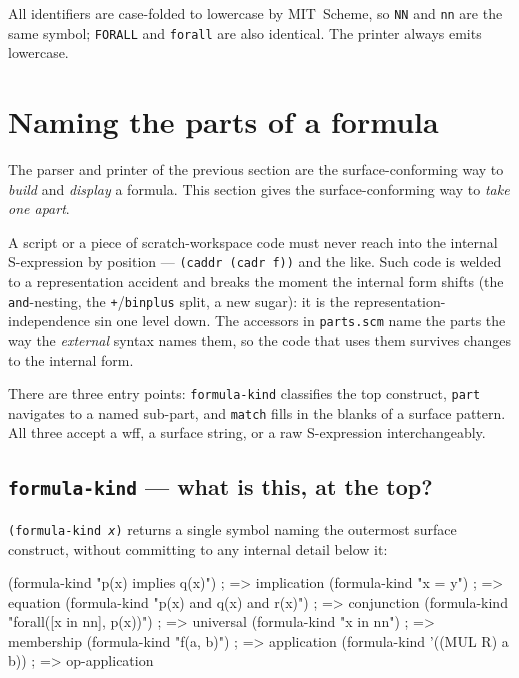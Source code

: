 \noindent
All identifiers are case-folded to lowercase by MIT~Scheme, so
\texttt{NN} and \texttt{nn} are the same symbol; \texttt{FORALL} and
\texttt{forall} are also identical.  The printer always emits lowercase.


\section{Naming the parts of a formula}
\label{sec:parts}

The parser and printer of the previous section are the surface-conforming
way to \emph{build} and \emph{display} a formula.  This section gives the
surface-conforming way to \emph{take one apart}.

A script or a piece of scratch-workspace code must never reach into the
internal S-expression by position --- \texttt{(caddr (cadr f))} and the
like.  Such code is welded to a representation accident and breaks the
moment the internal form shifts (the \texttt{and}-nesting, the
\texttt{+}/\texttt{binplus} split, a new sugar): it is the
representation-independence sin one level down.  The accessors in
\texttt{parts.scm} name the parts the way the \emph{external} syntax names
them, so the code that uses them survives changes to the internal form.

There are three entry points: \texttt{formula-kind} classifies the top
construct, \texttt{part} navigates to a named sub-part, and \texttt{match}
fills in the blanks of a surface pattern.  All three accept a wff, a
surface string, or a raw S-expression interchangeably.

\subsection{\texttt{formula-kind} --- what is this, at the top?}

\texttt{(formula-kind \textit{x})} returns a single symbol naming the
outermost surface construct, without committing to any internal detail
below it:

\begin{VNBsnip}
(formula-kind "p(x) implies q(x)")       ; => implication
(formula-kind "x = y")                   ; => equation
(formula-kind "p(x) and q(x) and r(x)")  ; => conjunction
(formula-kind "forall([x in nn], p(x))") ; => universal
(formula-kind "x in nn")                 ; => membership
(formula-kind "f(a, b)")                 ; => application
(formula-kind '((MUL R) a b))            ; => op-application
\end{VNBsnip}

